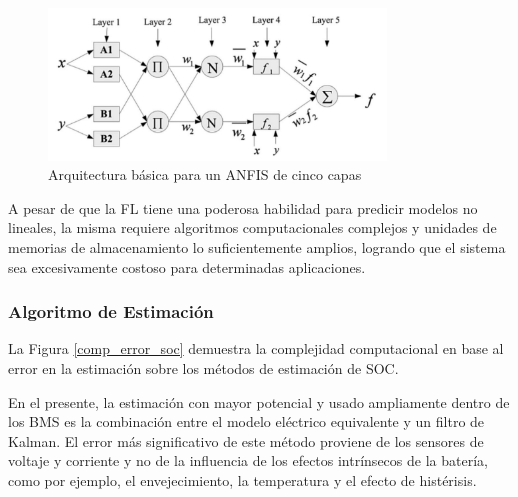 \documentclass[10pt,a4paper]{article}
\begin{document}
\begin{figure}[h!]
    \begin{center}
        \includegraphics[width=0.8\textwidth]{anfis_arch.png}
        \caption{Arquitectura b\'asica para un \acrshort{ANFIS} de cinco capas}
        \label{anfis_arch}
    \end{center}
\end{figure}

\noindent A pesar de que la \acrshort{FL} tiene una poderosa habilidad para 
predicir modelos no lineales, la misma requiere algoritmos computacionales 
complejos y unidades de memorias de almacenamiento lo suficientemente amplios, 
logrando que el sistema sea excesivamente costoso para determinadas 
aplicaciones.

\newpage

\subsubsection{Algoritmo de Estimaci\'on}

\noindent La Figura \ref{comp_error_soc} demuestra la complejidad computacional 
en base al error en la estimaci\'on sobre los m\'etodos de estimaci\'on de 
\acrshort{SOC}.

\noindent En el presente, la estimaci\'on con mayor potencial y usado
ampliamente dentro de los \acrshort{BMS} es la combinaci\'on entre el modelo
el\'ectrico equivalente y un filtro de Kalman. El error m\'as significativo de
este m\'etodo proviene de los sensores de voltaje y corriente y no de la
influencia de los efectos intr\'insecos de la bater\'ia, como por ejemplo, el
envejecimiento, la temperatura y el efecto de hist\'erisis.
\end{document}
